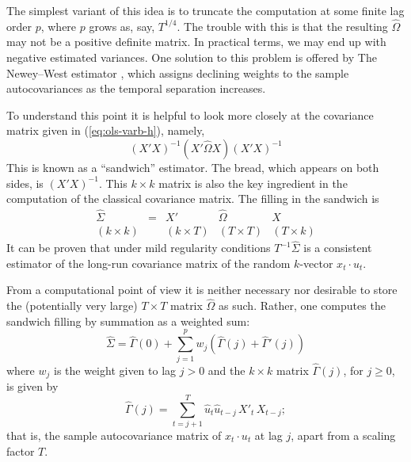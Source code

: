The simplest variant of this idea is to truncate the computation at
some finite lag order $p$, where $p$ grows as, say, $T^{1/4}$.  The
trouble with this is that the resulting $\hat{\Omega}$ may not be a
positive definite matrix.  In practical terms, we may end up with
negative estimated variances.  One solution to this problem is offered
by The Newey--West estimator \citep{newey-west87}, which assigns
declining weights to the sample autocovariances as the temporal
separation increases.

To understand this point it is helpful to look more closely at the
covariance matrix given in (\ref{eq:ols-varb-h}), namely,
%
\[
(X'X)^{-1} (X' \hat{\Omega} X) (X'X)^{-1}
\]
%
This is known as a ``sandwich'' estimator.  The bread, which appears
on both sides, is $(X'X)^{-1}$.  This $k \times k$ matrix is also the
key ingredient in the computation of the classical covariance matrix.
The filling in the sandwich is
%
\[
\begin{array}{ccccc}
\hat{\Sigma} & = & X' & \hat{\Omega} & X \\
{\scriptstyle (k \times k)} & &
{\scriptstyle (k \times T)} & {\scriptstyle (T \times T)} & 
  {\scriptstyle (T \times k)}
\end{array}
\]
%
It can be proven that under mild regularity conditions
$T^{-1} \hat{\Sigma}$ is a consistent estimator of the long-run
covariance matrix of the random $k$-vector $x_t \cdot u_t$.

From a computational point of view it is neither necessary nor
desirable to store the (potentially very large) $T \times T$ matrix
$\hat{\Omega}$ as such.  Rather, one computes the sandwich filling by
summation as a weighted sum:
%
\[
\hat{\Sigma} = \hat{\Gamma}(0) + \sum_{j=1}^p w_j 
  \left(\hat{\Gamma}(j) + \hat{\Gamma}'(j) \right)
\]
%
where $w_j$ is the weight given to lag $j > 0$ and the $k \times k$
matrix $\hat{\Gamma}(j)$, for $j \geq 0$, is given by
\[
  \hat{\Gamma}(j) = \sum_{t=j+1}^T \hat{u}_t \hat{u}_{t-j}\, X'_t\,
  X_{t-j} ;
\]
that is, the sample autocovariance matrix of $x_t \cdot u_t$ at lag
$j$, apart from a scaling factor $T$.

